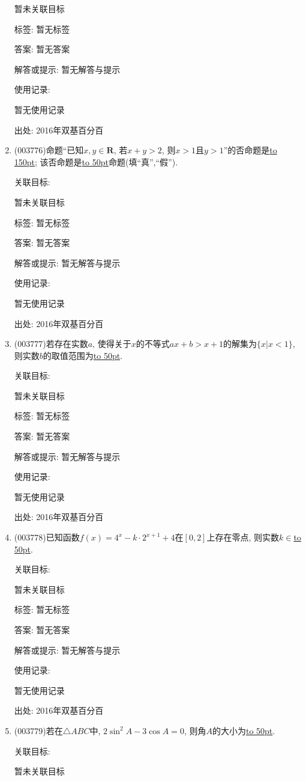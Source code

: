 \documentclass[10pt,a4paper]{article}
\newcommand{\blank}[1]{\underline{\hbox to #1pt{}}}
\begin{document}
\begin{enumerate}[1.]
暂未关联目标



标签: 暂无标签

答案: 暂无答案

解答或提示: 暂无解答与提示

使用记录:

暂无使用记录


出处: 2016年双基百分百
\item { (003776)}命题``已知$x,y\in \mathbf{R}$,  若$x+y>2$, 则$x>1$且$y>1$''的否命题是\blank{150}; 该否命题是\blank{50}命题(填``真'',``假'').


关联目标:

暂未关联目标



标签: 暂无标签

答案: 暂无答案

解答或提示: 暂无解答与提示

使用记录:

暂无使用记录


出处: 2016年双基百分百
\item { (003777)}若存在实数$a$, 使得关于$x$的不等式$ax+b>x+1$的解集为$\{x|x<1\}$, 则实数$b$的取值范围为\blank{50}.


关联目标:

暂未关联目标



标签: 暂无标签

答案: 暂无答案

解答或提示: 暂无解答与提示

使用记录:

暂无使用记录


出处: 2016年双基百分百
\item { (003778)}已知函数$f(x)=4^x-k\cdot 2^{x+1}+4$在$[0,2]$上存在零点, 则实数$k\in$\blank{50}.


关联目标:

暂未关联目标



标签: 暂无标签

答案: 暂无答案

解答或提示: 暂无解答与提示

使用记录:

暂无使用记录


出处: 2016年双基百分百
\item { (003779)}若在$\triangle ABC$中, $2\sin^2A-3\cos A=0$, 则角$A$的大小为\blank{50}.


关联目标:

暂未关联目标




\end{enumerate}
\end{document}
